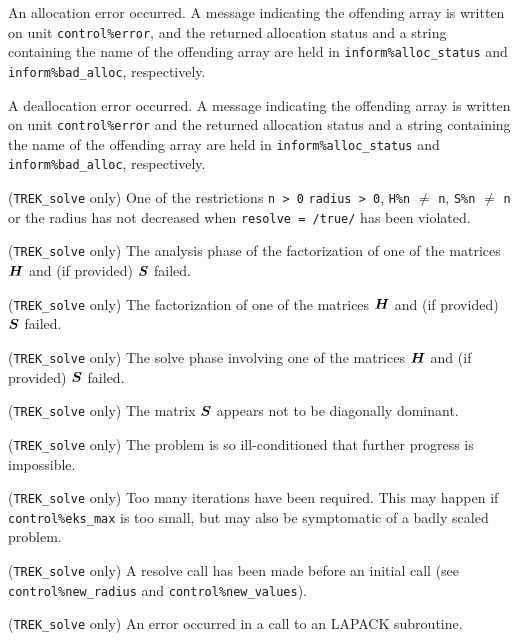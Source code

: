 \documentclass{galahad}
\newcommand{\packagename}{TREK}
\begin{document}
\begin{description}
 An allocation error occurred. A message indicating
the offending
array is written on unit {\tt control\%error}, and the returned allocation
status and a string containing the name of the offending array
are held in {\tt inform\%alloc\_\-status}
and {\tt inform\%bad\_alloc}, respectively.

 A deallocation error occurred.
A message indicating the offending
array is written on unit {\tt control\%error} and the returned allocation
status and a string containing the name of the offending array
are held in {\tt inform\%alloc\_\-status}
and {\tt inform\%bad\_alloc}, respectively.

 ({\tt \packagename\_solve} only)
One of the restrictions
{\tt n > 0}
{\tt radius > 0},
{\tt H\%n} $\neq$ {\tt n},
{\tt S\%n} $\neq$ {\tt n}
or the radius has not decreased when {\tt resolve = /true/}
has been violated.

 ({\tt \packagename\_solve} only)
The analysis phase of the factorization of one of the matrices 
${\bm{H}}$ and (if provided) ${\bm{S}}$ failed.

 ({\tt \packagename\_solve} only)
The factorization of one of the matrices 
${\bm{H}}$ and (if provided) ${\bm{S}}$ failed.

 ({\tt \packagename\_solve} only)
The solve phase involving one of the matrices 
${\bm{H}}$ and (if provided) ${\bm{S}}$ failed.

 ({\tt \packagename\_solve} only)
The matrix ${\bm{S}}$ appears not to be diagonally dominant.

 ({\tt \packagename\_solve} only)
The problem is so ill-conditioned that further progress is impossible.

 ({\tt \packagename\_solve} only)
Too many iterations have been required.  This may happen if
{\tt control\%eks\_max} is too small,
but may also be symptomatic of a badly scaled problem.

 ({\tt \packagename\_solve} only)
A resolve call has been made before an initial call (see 
{\tt control\%new\_radius} and {\tt control\%new\_values}).

 ({\tt \packagename\_solve} only)
An error occurred in a call to an LAPACK subroutine.

\end{description}
\end{document}
